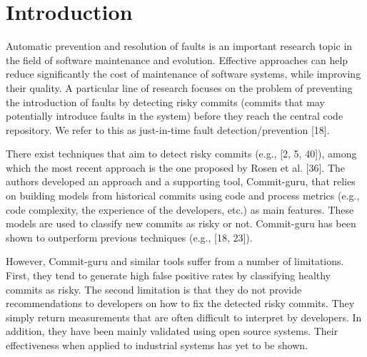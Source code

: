 \documentclass[sigconf]{acmart}
\begin{document}


\maketitle

\section{Introduction}\label{sec:introduction}

Automatic prevention and resolution of faults is an important research
topic in the field of software maintenance and evolution. Effective
approaches can help reduce significantly the cost of maintenance of
software systems, while improving their quality. A particular line of
research focuses on the problem of preventing the introduction of faults
by detecting risky commits (commits that may potentially introduce
faults in the system) before they reach the central code repository. We
refer to this as just-in-time fault detection/prevention [18].

There exist techniques that aim to detect risky commits (e.g., [2, 5,
40]), among which the most recent approach is the one proposed by
Rosen et al. [36]. The authors developed an approach and a
supporting tool, Commit-guru, that relies on building models from
historical commits using code and process metrics (e.g., code
complexity, the experience of the developers, etc.) as main features.
These models are used to classify new commits as risky or not.
Commit-guru has been shown to outperform previous techniques (e.g.,
[18, 23]).

However, Commit-guru and similar tools suffer from a number of
limitations. First, they tend to generate high false positive rates by
classifying healthy commits as risky. The second limitation is that they
do not provide recommendations to developers on how to fix the detected
risky commits. They simply return measurements that are often difficult
to interpret by developers. In addition, they have been mainly validated
using open source systems. Their effectiveness when applied to
industrial systems has yet to be shown.
\end{document}
